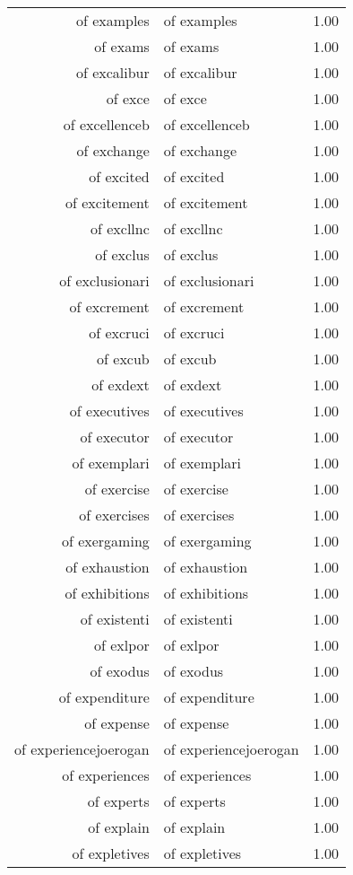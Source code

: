 \begin{table}[ht]
\begin{tabular}{rlr}
  of examples & of examples & 1.00 \\ 
  of exams & of exams & 1.00 \\ 
  of excalibur & of excalibur & 1.00 \\ 
  of exce & of exce & 1.00 \\ 
  of excellenceb & of excellenceb & 1.00 \\ 
  of exchange & of exchange & 1.00 \\ 
  of excited & of excited & 1.00 \\ 
  of excitement & of excitement & 1.00 \\ 
  of excllnc & of excllnc & 1.00 \\ 
  of exclus & of exclus & 1.00 \\ 
  of exclusionari & of exclusionari & 1.00 \\ 
  of excrement & of excrement & 1.00 \\ 
  of excruci & of excruci & 1.00 \\ 
  of excub & of excub & 1.00 \\ 
  of exdext & of exdext & 1.00 \\ 
  of executives & of executives & 1.00 \\ 
  of executor & of executor & 1.00 \\ 
  of exemplari & of exemplari & 1.00 \\ 
  of exercise & of exercise & 1.00 \\ 
  of exercises & of exercises & 1.00 \\ 
  of exergaming & of exergaming & 1.00 \\ 
  of exhaustion & of exhaustion & 1.00 \\ 
  of exhibitions & of exhibitions & 1.00 \\ 
  of existenti & of existenti & 1.00 \\ 
  of exlpor & of exlpor & 1.00 \\ 
  of exodus & of exodus & 1.00 \\ 
  of expenditure & of expenditure & 1.00 \\ 
  of expense & of expense & 1.00 \\ 
  of experiencejoerogan & of experiencejoerogan & 1.00 \\ 
  of experiences & of experiences & 1.00 \\ 
  of experts & of experts & 1.00 \\ 
  of explain & of explain & 1.00 \\ 
  of expletives & of expletives & 1.00 \\ 

\end{tabular}
\end{table}
